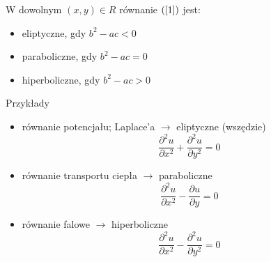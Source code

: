 \begin{frame}
  W dowolnym $(x,y) \in R$ równanie $(\ref{1})$ jest:
  \begin{itemize}
    \item eliptyczne, gdy $b^2 - ac < 0$
    \item paraboliczne, gdy $b^2 - ac = 0$
    \item hiperboliczne, gdy $b^2 - ac > 0$
  \end{itemize}
\end{frame}

\begin{frame}
  \begin{exampleblock}{Przykłady}
      \begin{itemize}
        \item równanie potencjału; Laplace'a $\rightarrow$ eliptyczne (wszędzie)
        $$\frac{{\partial}^2u}{{\partial}x^2} + \frac{{\partial}^2u}{{\partial}y^2} = 0$$

        \item równanie transportu ciepła $\rightarrow$ paraboliczne
        $$\frac{{\partial}^2u}{{\partial}x^2} - \frac{{\partial}u}{{\partial}y} = 0$$

        \item równanie falowe $\rightarrow$ hiperboliczne
        $$\frac{{\partial}^2u}{{\partial}x^2} - \frac{{\partial}^2u}{{\partial}y^2} = 0$$
      \end{itemize}
  \end{exampleblock}
\end{frame}
